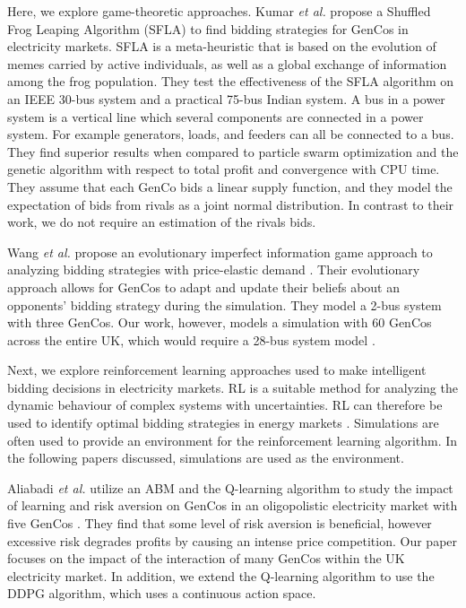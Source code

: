 \documentclass[conference]{IEEEtran}
\begin{document}
Here, we explore game-theoretic approaches. Kumar \textit{et al.} propose a Shuffled Frog Leaping Algorithm (SFLA) \cite{VijayaKumar2014} to find bidding strategies for GenCos in electricity markets. SFLA is a meta-heuristic that is based on the evolution of memes carried by active individuals, as well as a global exchange of information among the frog population. They test the effectiveness of the SFLA algorithm on an IEEE 30-bus system and a practical 75-bus Indian system. A bus in a power system is a vertical line which several components are connected in a power system. For example generators, loads, and feeders can all be connected to a bus. They find superior results when compared to particle swarm optimization and the genetic algorithm with respect to total profit and convergence with CPU time. They assume that each GenCo bids a linear supply function, and they model the expectation of bids from rivals as a joint normal distribution. In contrast to their work, we do not require an estimation of the rivals bids.

Wang \textit{et al.} propose an evolutionary imperfect information game approach to analyzing bidding strategies with price-elastic demand \cite{Wang2011}. Their evolutionary approach allows for GenCos to adapt and update their beliefs about an opponents' bidding strategy during the simulation. They model a 2-bus system with three GenCos. Our work, however, models a simulation with 60 GenCos across the entire UK, which would require a 28-bus system model \cite{Bell2010}. 

Next, we explore reinforcement learning approaches used to make intelligent bidding decisions in electricity markets. RL is a suitable method for analyzing the dynamic behaviour of complex systems with uncertainties. RL can therefore be used to identify optimal bidding strategies in energy markets \cite{Yang2020}. Simulations are often used to provide an environment for the reinforcement learning algorithm. In the following papers discussed, simulations are used as the environment.


Aliabadi \textit{et al.} utilize an ABM and the Q-learning algorithm to study the impact of learning and risk aversion on GenCos in an oligopolistic electricity market with five GenCos \cite{EsmaeiliAliabadi2017}. They find that some level of risk aversion is beneficial, however excessive risk degrades profits by causing an intense price competition. Our paper focuses on the impact of the interaction of many GenCos within the UK electricity market. In addition, we extend the Q-learning algorithm to use the DDPG algorithm, which uses a continuous action space.
\end{document}
